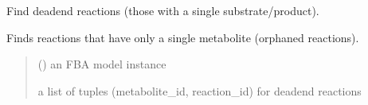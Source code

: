 \documentclass[letterpaper,12pt,english]{sphinxmanual}
\begin{document}
\begin{fulllineitems}
\label{\detokenize{api/core:cbmpy.CBTools.findDeadEndReactions}}
\pysigstartsignatures
\pysiglinewithargsret
{}
{}
{}
\pysigstopsignatures
\sphinxAtStartPar
Find dead\sphinxhyphen{}end reactions (those with a single substrate/product).

\sphinxAtStartPar
Finds reactions that have only a single metabolite (orphaned reactions).
\begin{quote}\begin{description}
\sphinxAtStartPar
{} () \textendash{} an FBA model instance

\sphinxAtStartPar
{} \textendash{} a list of tuples (metabolite\_id, reaction\_id) for dead\sphinxhyphen{}end reactions

\end{description}\end{quote}

\end{fulllineitems}

\end{document}
